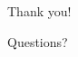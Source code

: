 \documentclass[xcolor={usenames,dvipsnames}]{beamer}
\renewcommand{\emph}[1]{\alert{#1}}
\begin{document}
%

\begin{frame}{Thank you!}
  \begin{center}
    \Huge Questions?
  \end{center}
\end{frame}


%
%
%
%



%
%
\end{document}
